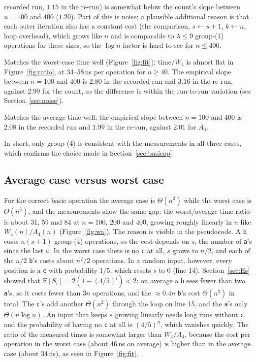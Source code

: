 \documentclass[11pt]{article}
\theoremstyle{remark}
\newcommand{\E}{\mathrm{E}}
\newcommand{\ta}{\texttt{a}}
\newcommand{\tb}{\texttt{b}}
\newcommand{\tc}{\texttt{c}}
\begin{document}
\begin{description}[leftmargin=1.2em,style=nextline]
recorded run, $1.15$ in the re-run) is somewhat below the count's slope between $n=100$ and $400$ ($1.20$). Part of this
is noise; a plausible additional reason is that each outer iteration also has a constant cost (the comparison,
$s\gets s+1$, $k\gets n$, loop overhead), which grows like $n$ and is comparable to $\lambda\le 9$ group-(4) operations
for these sizes, so the $\log n$ factor is hard to see for $n\le 400$.
\item[$W_4(n)$, $\Theta(n^3)$.] Matches the worst-case time well (Figure~\ref{fig:fit}); time$/W_4$ is almost flat
in Figure~\ref{fig:ratio}, at 34--58\,ns per operation for $n\ge 40$. The empirical slope between $n=100$ and $400$ is
$2.80$ in the recorded run and $3.16$ in the re-run, against $2.99$ for the count, so the difference is within the
run-to-run variation (see Section~\ref{sec:noise}).
\item[$A_4(n)$, $\Theta(n^2)$.] Matches the average time well; the empirical slope between $n=100$ and $400$ is
$2.08$ in the recorded run and $1.99$ in the re-run, against $2.01$ for $A_4$.
\end{description}
In short, only group (4) is consistent with the measurements in all three cases, which confirms the choice made in
Section~\ref{sec:basicop}.

\subsection{Average case versus worst case}
\label{sec:avgworst}
For the correct basic operation the average case is $\Theta(n^2)$ while the worst case is $\Theta(n^3)$, and the
measurements show the same gap: the worst/average time ratio is about 31, 59 and 84 at $n=100$, $200$ and $400$,
growing roughly linearly in $n$ like $W_4(n)/A_4(n)$ (Figure~\ref{fig:wa}). The reason is visible in the pseudocode.
A \tb{} costs $n(s+1)$ group-(4) operations, so the cost depends on $s$, the number of \ta's since the last \tc.
In the worst case there is no \tc{} at all, $s$ grows to $n/2$, and each of the $n/2$ \tb's costs about $n^2/2$
operations. In a random input, however, every position is a \tc{} with probability $1/5$, which resets $s$ to $0$
(line 14). Section~\ref{sec:Es} showed that $\E[S_i]=2(1-(4/5)^i)<2$: on average a \tb{} sees fewer than two \ta's,
so it costs fewer than $3n$ operations, and the $\approx 0.4n$ \tb's cost $\Theta(n^2)$ in total. The \tc's add
another $\Theta(n^2)$ through the loop on line 15, and the \ta's only $\Theta(n\log n)$. An input that keeps $s$
growing linearly needs long runs without \tc, and the probability of having no \tc{} at all is $(4/5)^n$, which
vanishes quickly. The ratio of the measured times is somewhat larger than $W_4/A_4$, because the cost per operation in
the worst case (about 46\,ns on average) is higher than in the average case (about 34\,ns), as seen in
Figure~\ref{fig:fit}.
\end{document}
